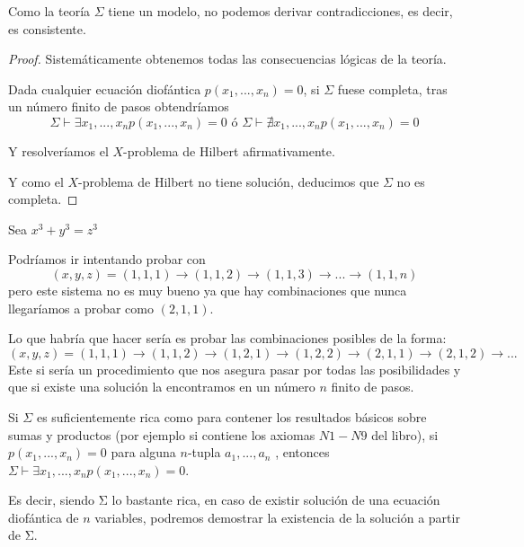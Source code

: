 \obs Como la teoría $Σ$ tiene un modelo, no podemos derivar contradicciones, es decir, es consistente.

\begin{proof}
Sistemáticamente obtenemos todas las consecuencias lógicas de la teoría.

Dada cualquier ecuación diofántica $p(x_1,...,x_n) = 0$, si $Σ$ fuese completa, tras un número finito de pasos obtendríamos
\[Σ\vdash ∃x_1,...,x_n p(x_1,...,x_n) = 0 \text{ ó } Σ\vdash \nexists x_1,...,x_n p(x_1,...,x_n) = 0\]

Y resolveríamos el $X$-problema de Hilbert afirmativamente.

Y como el $X$-problema de Hilbert no tiene solución, deducimos que $Σ$ no es completa.
\end{proof}



\begin{example}
Sea $x^3 + y^3 = z^3$

Podríamos ir intentando probar con
\[(x,y,z) = (1,1,1) \to (1,1,2) \to (1,1,3) \to ... \to (1,1,n)\]
pero este sistema no es muy bueno ya que hay combinaciones que nunca llegaríamos a probar como $(2,1,1)$.

Lo que habría que hacer sería es probar las combinaciones posibles de la forma:
\[(x,y,z) = (1,1,1) \to (1,1,2) \to (1,2,1) \to (1,2,2) \to (2,1,1) \to (2,1,2) \to ...\]
Este si sería un procedimiento que nos asegura pasar por todas las posibilidades y que si existe una solución la encontramos en un número $n$ finito de pasos.
\end{example}

\obs Si $Σ$ es suficientemente rica como para contener los resultados básicos sobre sumas y productos (por ejemplo si contiene los axiomas $N1 - N9$ del libro), si $p(x_1,...,x_n) = 0$ para alguna $n$-tupla $a_1,...,a_n$ , entonces $Σ\vdash ∃x_1,...,x_n p(x_1,...,x_n ) = 0$.

Es decir, siendo Σ lo bastante rica, en caso de existir solución de una ecuación diofántica de $n$ variables, podremos demostrar la existencia de la solución a partir de Σ.


